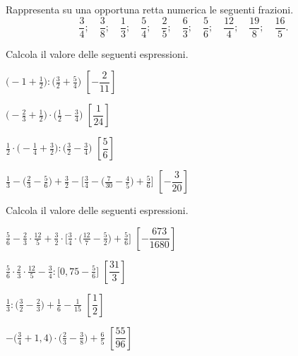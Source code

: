 \begin{esercizio}
\label{ese:3.142}
Rappresenta su una opportuna retta numerica le seguenti frazioni.
\[\frac{3}{4};\quad\frac{3}{8};\quad\frac{1}{3};\quad\frac{5}{4};\quad
\frac{2}{5};\quad\frac{6}{3};\quad\frac{5}{6};\quad%
\frac{12}{4};\quad\frac{19}{8};\quad\frac{16}{5}.\]
\end{esercizio}

\begin{esercizio}[\Ast]
\label{ese:3.143}
Calcola il valore delle seguenti espressioni.
\begin{enumeratea}
\spazielenx
\item \(\displaystyle{\bigg(-1+\frac{1}{2}\bigg):\bigg(\frac{3}{2}+
\frac{5}{4}\bigg)}\)
  \hfill \(\left[-\dfrac{2}{11} \right]\)
\item \(\displaystyle{\bigg(-{\frac{2}{3}}+\frac{1}{2}\bigg)\cdot
\bigg(\frac{1}{2}-\frac{3}{4}\bigg)}\)
  \hfill \(\left[\dfrac{1}{24} \right]\)
\item \(\displaystyle{\frac{1}{2}\cdot\bigg(-{\frac{1}{4}}+\frac{3}{2}\bigg):
\bigg(\frac{3}{2}-\frac{3}{4}\bigg)}\)
  \hfill \(\left[\dfrac{5}{6} \right]\)
\item \(\displaystyle{\frac{1}{3}-\bigg(\frac{2}{3}-\frac{5}{6}\bigg)+
\frac{3}{2}-\bigg[\frac{3}{4}-\bigg(\frac{7}{30}%
-\frac{4}{5}\bigg)+\frac{5}{6}\bigg]}\)
  \hfill \(\left[-\dfrac{3}{20} \right]\)
\end{enumeratea}
\end{esercizio}

\begin{esercizio}[\Ast]
\label{ese:3.144}
 Calcola il valore delle seguenti espressioni.
\begin{enumeratea}
\spazielenx
\item \(\displaystyle{\frac{5}{6}-\frac{2}{3}\cdot\frac{12}{5}+\frac{3}{2}
\cdot\bigg[\frac{3}{4}\cdot%
\bigg(\frac{12}{7}-\frac{5}{2}\bigg)+\frac{5}{6}\bigg]}\)
  \hfill \(\left[-\dfrac{673}{1680} \right]\)
\item \(\displaystyle{\frac{5}{6}\cdot{\frac{2}{3}}\cdot\frac{12}{5}-
\frac{3}{4}:\bigg[0,75-\frac{5}{6}\bigg]}\)
  \hfill \(\left[\dfrac{31}{3} \right]\)
\item \(\displaystyle{\frac{1}{3}:\bigg(\frac{3}{2}-\frac{2}{3}\bigg)+
\frac{1}{6}-\frac{1}{15}}\)
  \hfill \(\left[\dfrac{1}{2} \right]\)
\item \(\displaystyle{-\bigg(\frac{3}{4}+1,4\bigg)\cdot\bigg(\frac{2}{3}-
\frac{3}{8}\bigg)+\frac{6}{5}}\)
  \hfill \(\left[\dfrac{55}{96} \right]\)
\end{enumeratea}
\end{esercizio}

